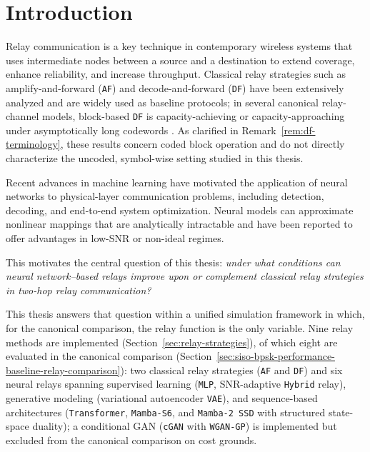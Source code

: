\chapter{Introduction}\label{sec:introduction}

Relay communication is a key technique in contemporary wireless systems that uses intermediate nodes between a source and a destination to extend coverage, enhance reliability, and increase throughput. Classical relay strategies such as amplify-and-forward (\texttt{AF}) and decode-and-forward (\texttt{DF}) have been extensively analyzed and are widely used as baseline protocols; in several canonical relay-channel models, block-based \texttt{DF} is capacity-achieving or capacity-approaching under asymptotically long codewords \cite{CoverGamal1979RelayChannel,ElGamalKim2011NetworkIT,Laneman2004CooperativeDiversity,RankovWittneben2007HalfDuplexRelay,Nosratinia2004CooperativeCommunication}. As clarified in Remark~\ref{rem:df-terminology}, these results concern coded block operation and do not directly characterize the uncoded, symbol-wise setting studied in this thesis.

Recent advances in machine learning have motivated the application of neural networks to physical-layer communication problems, including detection, decoding, and end-to-end system optimization. Neural models can approximate nonlinear mappings that are analytically intractable and have been reported to offer advantages in low-SNR or non-ideal regimes.

This motivates the central question of this thesis: \emph{under what conditions can neural network--based relays improve upon or complement classical relay strategies in two-hop relay communication?}

This thesis answers that question within a unified simulation framework in which, for the canonical comparison, the relay function is the only variable. Nine relay methods are implemented (Section~\ref{sec:relay-strategies}), of which eight are evaluated in the canonical comparison (Section~\ref{sec:siso-bpsk-performance-baseline-relay-comparison}): two classical relay strategies (\texttt{AF} and \texttt{DF}) and six neural relays spanning supervised learning (\texttt{MLP}, SNR-adaptive \texttt{Hybrid} relay), generative modeling (variational autoencoder \texttt{VAE}), and sequence-based architectures (\texttt{Transformer}, \texttt{Mamba-S6}, and \texttt{Mamba-2 SSD} with structured state-space duality); a conditional GAN (\texttt{cGAN} with \texttt{WGAN-GP}) is implemented but excluded from the canonical comparison on cost grounds.

